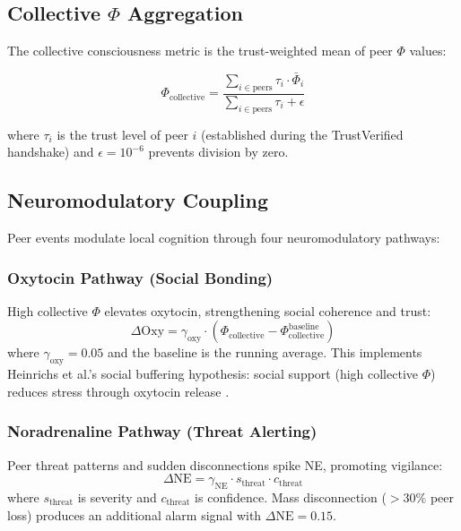\documentclass[11pt,a4paper]{article}
\begin{document}
\subsection{Collective $\Phi$ Aggregation}

The collective consciousness metric is the trust-weighted mean of peer $\Phi$ values:

\begin{equation}
\Phi_{\text{collective}} = \frac{\sum_{i \in \text{peers}} \tau_i \cdot \bar{\Phi}_i}{\sum_{i \in \text{peers}} \tau_i + \epsilon}
\end{equation}

\noindent where $\tau_i$ is the trust level of peer $i$ (established during the TrustVerified handshake) and $\epsilon = 10^{-6}$ prevents division by zero.

\subsection{Neuromodulatory Coupling}

Peer events modulate local cognition through four neuromodulatory pathways:

\subsubsection{Oxytocin Pathway (Social Bonding)}
High collective $\Phi$ elevates oxytocin, strengthening social coherence and trust:
\begin{equation}
\Delta \text{Oxy} = \gamma_{\text{oxy}} \cdot (\Phi_{\text{collective}} - \Phi_{\text{collective}}^{\text{baseline}})
\end{equation}
where $\gamma_{\text{oxy}} = 0.05$ and the baseline is the running average. This implements Heinrichs et al.'s social buffering hypothesis: social support (high collective $\Phi$) reduces stress through oxytocin release \citep{heinrichs2003}.

\subsubsection{Noradrenaline Pathway (Threat Alerting)}
Peer threat patterns and sudden disconnections spike NE, promoting vigilance:
\begin{equation}
\Delta \text{NE} = \gamma_{\text{NE}} \cdot s_{\text{threat}} \cdot c_{\text{threat}}
\end{equation}
where $s_{\text{threat}}$ is severity and $c_{\text{threat}}$ is confidence. Mass disconnection ($> 30\%$ peer loss) produces an additional alarm signal with $\Delta \text{NE} = 0.15$.
\end{document}
